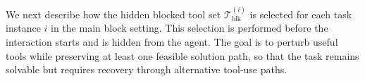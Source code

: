 

We next describe how the hidden blocked tool set $\mathcal{T}^{(i)}_{\mathrm{blk}}$ is selected for each task instance $i$ in the main block setting.
This selection is performed before the interaction starts and is hidden from the agent.
The goal is to perturb useful tools while preserving at least one feasible solution path, so that the task remains solvable but requires recovery through alternative tool-use paths.


